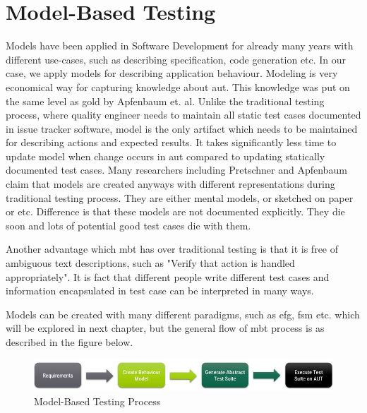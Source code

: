 \section{Model-Based Testing}

\par
Models have been applied in Software Development for already many years with different use-cases, such as describing specification, code generation etc. In our case, we apply models for describing application behaviour. Modeling is very economical way for capturing knowledge about \acrlong{aut}. This knowledge was put on the same level as gold by Apfenbaum et. al. \cite{Apfenbaum_MBT} Unlike the traditional testing process, where quality engineer needs to maintain all static test cases documented in issue tracker software, model is the only artifact which needs to be maintained for describing actions and expected results. It takes significantly less time to update model when change occurs in \acrlong{aut} compared to updating statically documented test cases. Many researchers including Pretschner \cite{Pretschner_MBTInPractice} and Apfenbaum \cite{Apfenbaum_MBT} claim that models are created anyways with different representations during traditional testing process. They are either mental models, or sketched on paper or etc. Difference is that these models are not documented explicitly. They die soon and lots of potential good test cases die with them.

\par
Another advantage which \acrshort{mbt} has over traditional testing is that it is free of ambiguous text descriptions, such as "Verify that action is handled appropriately". It is fact that different people write different test cases and information encapsulated in test case can be interpreted in many ways.

\par
Models can be created with many different paradigms, such as \acrlong{efg}, \acrlong{fsm} etc. which will be explored in next chapter, but the general flow of \acrshort{mbt} process is as described in the figure below. 


\begin{figure} [htbp!]
	\centering
					\includegraphics[width=1\textwidth]{figures/MBT_Flow.JPG}
					\caption{\label{Fig:MBT_Flow} Model-Based Testing Process}
\end{figure}

